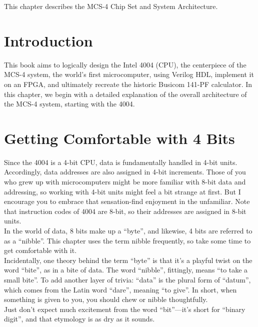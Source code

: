 This chapter describes the MCS-4 Chip Set and System Architecture.
\section{Introduction}
This book aims to logically design the Intel 4004 (CPU), the centerpiece of the MCS-4 system, the world's first microcomputer, using Verilog HDL, implement it on an FPGA, and ultimately recreate the historic Busicom 141-PF calculator. In this chapter, we begin with a detailed explanation of the overall architecture of the MCS-4 system, starting with the 4004.\cite{MCS4HardwareManual}

\section{Getting Comfortable with 4 Bits}
Since the 4004 is a 4-bit CPU, data is fundamentally handled in 4-bit units. Accordingly, data addresses are also assigned in 4-bit increments. Those of you who grew up with microcomputers might be more familiar with 8-bit data and addressing, so working with 4-bit units might feel a bit strange at first. But I encourage you to embrace that sensation-find enjoyment in the unfamiliar. Note that instruction codes of 4004 are 8-bit, so their addresses are assigned in 8-bit units.\\

In the world of data, 8 bits make up a ``byte'',  and likewise, 4 bits are referred to as a ``nibble''. This chapter uses the term nibble frequently, so take some time to get comfortable with it.\\

Incidentally, one theory behind the term ``byte'' is that it's a playful twist on the word ``bite'', as in a bite of data. The word ``nibble'',  fittingly, means ``to take a small bite''. To add another layer of trivia: ``data'' is the plural form of ``datum'', which comes from the Latin word ``dare'', meaning ``to give''. In short, when something is given to you, you should chew or nibble thoughtfully. \\

Just don't expect much excitement from the word ``bit''—it's short for ``binary digit'', and that etymology is as dry as it sounds.\\

